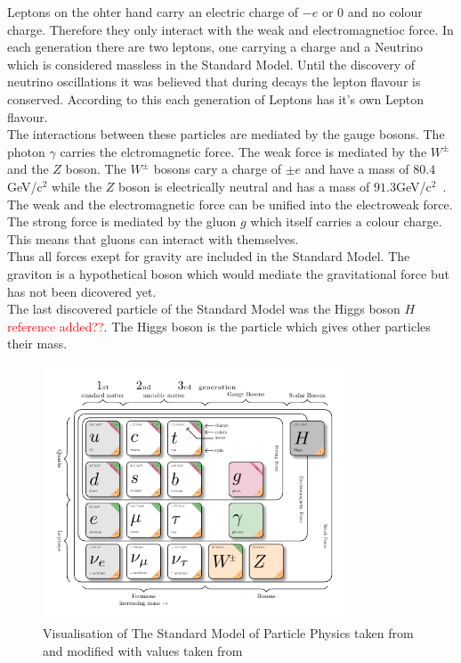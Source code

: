 Leptons on the ohter hand carry an electric charge of $-e$ or $0$ and no colour charge. Therefore they only interact with the weak and electromagnetioc force. In each generation there are two leptons, one carrying a charge and a Neutrino which is considered massless in the Standard Model. Until the discovery of neutrino oscillations it was believed that during decays the lepton flavour is conserved. According to this each generation of Leptons has it's own Lepton flavour. 
\\
The interactions between these particles are mediated by the gauge bosons. The photon $\gamma$ carries the elctromagnetic force. The weak force is mediated by the $W^\pm$ and the $Z$ boson. 
The $W^\pm$ bosons cary a charge of $\pm e$ and have a mass of $80.4 $GeV/c$^2$ while the $Z$ boson is electrically neutral and has a mass of $91.3 $GeV/c$^2$~\cite{pdg2025}.
The weak and the electromagnetic force can be unified into the electroweak force. The strong force is mediated by the gluon $g$ which itself carries a colour charge. This means that gluons can interact with themselves.\\
Thus all forces exept for gravity are included in the Standard Model. The graviton is a hypothetical boson which would mediate the gravitational force but has not been dicovered yet.\\
The last discovered particle of the Standard Model was the Higgs boson $H$ \textcolor{red}{reference added??}. The Higgs boson is the particle which gives other particles their mass. 
\begin{figure}
    \centering
    \includegraphics[width=0.8\textwidth]{figures/standard_model_pdf.pdf}
    \caption{Visualisation of The Standard Model of Particle Physics taken from~\cite{texample_model_physics} and modified with values taken from~\cite{pdg2025}}\label{fig:standard_model}
\end{figure}
